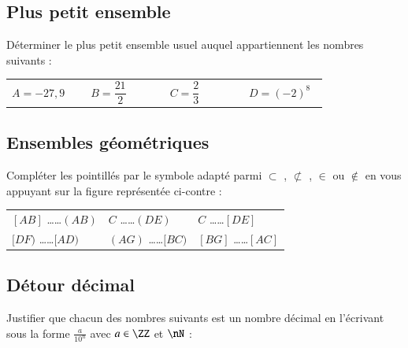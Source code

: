 \documentclass[oneside,12pt]{article}          %
\begin{document}
\subsection{Plus petit ensemble}
Déterminer le plus petit ensemble usuel auquel appartiennent les nombres suivants : \\
\begin{tabular}{P{0.23\linewidth} P{0.23\linewidth} P{0.23\linewidth} P{0.23\linewidth}}
	$A = -27,9$ & $B = \dfrac{21}{2}$ & $C = \dfrac{2}{3}$ & $D = (-2)^8$
\end{tabular}



\subsection{Ensembles géométriques}
\begin{minipage}{0.6\textwidth}
	Compléter les pointillés par le symbole adapté parmi $\subset$ , $\not\subset$ , $\in$ ou $\notin$ en vous appuyant sur la figure représentée ci-contre :
	
	\renewcommand{\arraystretch}{2}
	\begin{tabular}{P{0.3\textwidth} P{0.3\textwidth} P{0.3\textwidth}}
		$[AB]$ \ldots\ldots $(AB)$ & $C$ \ldots\ldots $(DE)$ & $C$ \ldots\ldots $[DE]$ \\
		$[DF)$ \ldots\ldots $[AD)$ & $(AG)$ \ldots\ldots $[BC)$ & $[BG]$ \ldots\ldots $[AC]$
	\end{tabular}
\end{minipage} \hspace{5mm}
\begin{minipage}{0.4\textwidth}
\end{minipage}



\subsection{Détour décimal}
Justifier que chacun des nombres suivants est un nombre décimal en l'écrivant sous la forme $\frac{a}{10^n}$ avec $a\in\ZZ$ et $\nN$ :
\end{document}
